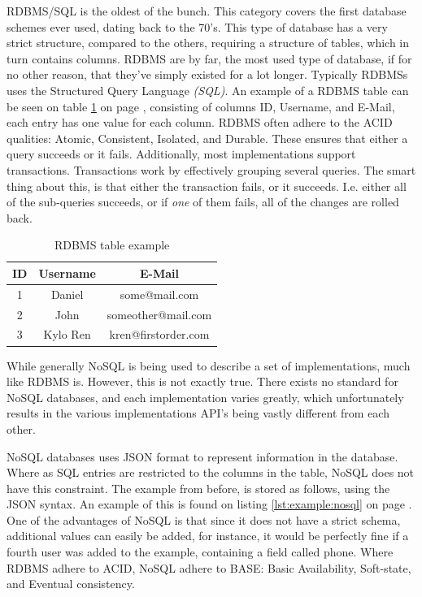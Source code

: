 		RDBMS/SQL is the oldest of the bunch. This category covers the first database schemes ever used, dating back to the 70's. This type of database has a very strict structure, compared to the others, requiring a structure of tables, which in turn contains columns. RDBMS are by far, the most used type of database, if for no other reason, that they've simply existed for a lot longer. Typically RDBMSs uses the Structured Query Language \emph{(SQL)}. An example of a RDBMS table can be seen on table \ref{fig:example:rldb} on page \pageref{fig:example:rldb}, consisting of columns ID, Username, and E-Mail, each entry has one value for each column. RDBMS often adhere to the ACID qualities: Atomic, Consistent, Isolated, and Durable. These ensures that either a query succeeds or it fails. Additionally, most implementations support transactions. Transactions work by effectively grouping several queries. The smart thing about this, is that either the transaction fails, or it succeeds. I.e. either all of the sub-queries succeeds, or if \emph{one} of them fails, all of the changes are rolled back.

		\begin{table}[h!]
			\centering
			\begin{tabular}{|c|c|c|}
				\hline
				\textbf{ID} 		& 	\textbf{Username} 		& \textbf{E-Mail} 		\\
				\hline
				1 					& Daniel 					& some@mail.com 		\\
				\hline
				2 					& John 						& someother@mail.com 	\\
				\hline
				3 					& Kylo Ren 					& kren@firstorder.com 	\\
				\hline
			\end{tabular}
			\caption{RDBMS table example}
			\label{fig:example:rldb}
		\end{table}

		While generally NoSQL is being used to describe a set of implementations, much like RDBMS is. However, this is not exactly true. There exists no standard for NoSQL databases, and each implementation varies greatly, which unfortunately results in the various implementations API's being vastly different from each other.

		NoSQL databases uses JSON format to represent information in the database. Where as SQL entries are restricted to the columns in the table, NoSQL does not have this constraint. The example from before, is stored as follows, using the JSON syntax. An example of this is found on listing \ref{lst:example:nosql} on page \pageref{lst:example:nosql}. One of the advantages of NoSQL is that since it does not have a strict schema, additional values can easily be added, for instance, it would be perfectly fine if a fourth user was added to the example, containing a field called phone. Where RDBMS adhere to ACID, NoSQL adhere to BASE: Basic Availability, Soft-state, and Eventual consistency.

